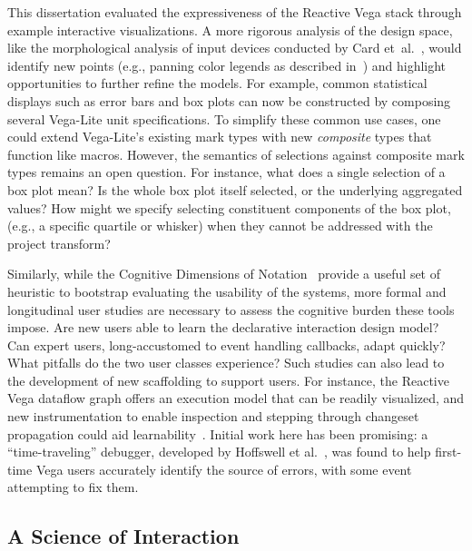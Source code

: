 This dissertation evaluated the expressiveness of the Reactive Vega stack
through example interactive visualizations. A more rigorous analysis of the
design space, like the morphological analysis of input devices conducted by Card
et~al.~\cite{card:morphological}, would identify new points (e.g., panning color
legends as described in~) and highlight opportunities to
further refine the models. For example, common statistical displays such as
error bars and box plots can now be constructed by composing several Vega-Lite
unit specifications. To simplify these common use cases, one could extend
Vega-Lite's existing mark types with new \emph{composite} types that function
like macros. However, the semantics of selections against composite mark types
remains an open question. For instance, what does a single selection of a box
plot mean? Is the whole box plot itself selected, or the underlying aggregated
values? How might we specify selecting constituent components of the box plot,
(e.g., a specific quartile or whisker) when they cannot be addressed with the
project transform?

Similarly, while the Cognitive Dimensions of Notation~\cite{blackwell:cogdim}
provide a useful set of heuristic to bootstrap evaluating the usability of the
systems, more formal and longitudinal user studies are necessary to assess the
cognitive burden these tools impose. Are new users able to learn the declarative
interaction design model? Can expert users, long-accustomed to event handling
callbacks, adapt quickly? What pitfalls do the two user classes experience? Such
studies can also lead to the development of new scaffolding to support users.
For instance, the Reactive Vega dataflow graph offers an execution model that
can be readily visualized, and new instrumentation to enable inspection and
stepping through changeset propagation could aid learnability~\cite{guo:tutor}.
Initial work here has been promising: a ``time-traveling'' debugger, developed
by Hoffswell et al.~\cite{hoffswell:debugging}, was found to help first-time
Vega users accurately identify the source of errors, with some event attempting
to fix them.

\vspace{-10pt}

\subsection{A Science of Interaction}

\vspace{-7pt}

